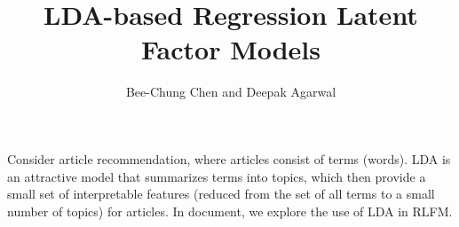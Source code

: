 \documentclass{article}
\begin{document}
\title{LDA-based Regression Latent Factor Models}
\author{Bee-Chung Chen and Deepak Agarwal}
\maketitle

Consider article recommendation, where articles consist of terms (words). LDA is an attractive model that summarizes terms into topics, which then provide a small set of interpretable features (reduced from the set of all terms to a small number of topics) for articles. In document, we explore the use of LDA in RLFM.



\end{document}
